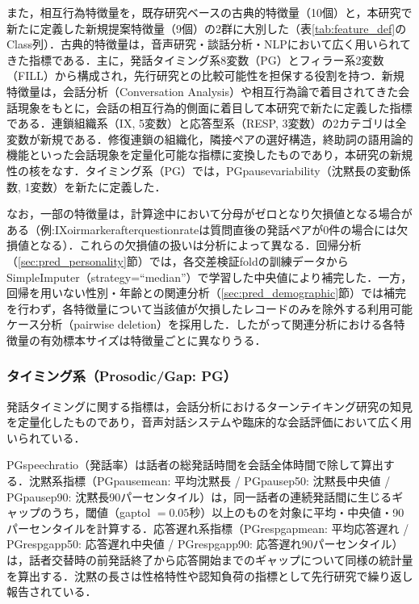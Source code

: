 \documentclass[dvipdfmx,11pt,a4paper]{bxjsarticle}
\renewcommand{\_}{\paperorigunderscore\allowbreak}%
\begin{document}
また，相互行為特徴量を，既存研究ベースの古典的特徴量（10個）と，本研究で新たに定義した新規提案特徴量（9個）の2群に大別した（表\ref{tab:feature_def}のClass列）．古典的特徴量は，音声研究・談話分析・NLPにおいて広く用いられてきた指標である．主に，発話タイミング系8変数（PG）とフィラー系2変数（FILL）から構成され，先行研究との比較可能性を担保する役割を持つ．新規特徴量は，会話分析（Conversation Analysis）や相互行為論で着目されてきた会話現象をもとに，会話の相互行為的側面に着目して本研究で新たに定義した指標である．連鎖組織系（IX, 5変数）と応答型系（RESP, 3変数）の2カテゴリは全変数が新規である．修復連鎖の組織化\cite{schegloff1977}，隣接ペアの選好構造\cite{sacks1974}，終助詞の語用論的機能といった会話現象を定量化可能な指標に変換したものであり，本研究の新規性の核をなす．タイミング系（PG）では，PG\_pause\_variability（沈黙長の変動係数, 1変数）を新たに定義した．

なお，一部の特徴量は，計算途中において分母がゼロとなり欠損値となる場合がある（例:IX\_oirmarker\_after\_question\_rateは質問直後の発話ペアが0件の場合には欠損値となる）．これらの欠損値の扱いは分析によって異なる．回帰分析（\ref{sec:pred_personality}節）では，各交差検証foldの訓練データからSimpleImputer（strategy=``median''）で学習した中央値により補完した．一方，回帰を用いない性別・年齢との関連分析（\ref{sec:pred_demographic}節）では補完を行わず，各特徴量について当該値が欠損したレコードのみを除外する利用可能ケース分析（pairwise deletion）を採用した．したがって関連分析における各特徴量の有効標本サイズは特徴量ごとに異なりうる．


\subsubsection{タイミング系（Prosodic/Gap: PG）}
発話タイミングに関する指標は，会話分析におけるターンテイキング研究\cite{sacks1974}の知見を定量化したものであり，音声対話システムや臨床的な会話評価において広く用いられている\cite{levitan2012,deruiter2006}．

PG\_speech\_ratio（発話率）は話者の総発話時間を会話全体時間で除して算出する．沈黙系指標（PG\_pause\_mean: 平均沈黙長 / PG\_pause\_p50: 沈黙長中央値 / PG\_pause\_p90: 沈黙長90パーセンタイル）は，同一話者の連続発話間に生じるギャップのうち，閾値（gap\_tol $= 0.05$秒）以上のものを対象に平均・中央値・90パーセンタイルを計算する．応答遅れ系指標（PG\_resp\_gap\_mean: 平均応答遅れ / PG\_resp\_gap\_p50: 応答遅れ中央値 / PG\_resp\_gap\_p90: 応答遅れ90パーセンタイル）は，話者交替時の前発話終了から応答開始までのギャップについて同様の統計量を算出する．沈黙の長さは性格特性や認知負荷の指標として先行研究で繰り返し報告されている\cite{campione2002}．
\end{document}
